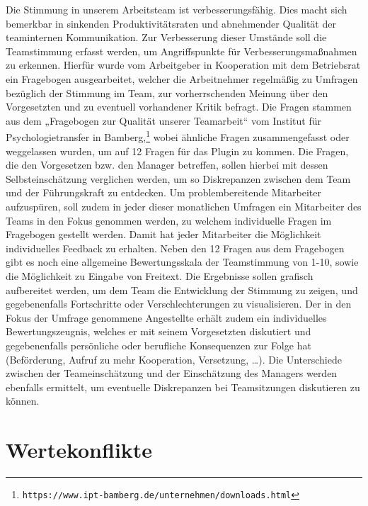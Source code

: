 \documentclass[a4paper,12pt,]{article}
\begin{document}
Die Stimmung in unserem Arbeitsteam ist verbesserungsfähig. Dies macht sich bemerkbar in sinkenden Produktivitätsraten und abnehmender Qualität der teaminternen Kommunikation. Zur Verbesserung dieser Umstände soll die Teamstimmung erfasst werden, um Angriffspunkte für Verbesserungsmaßnahmen zu erkennen.
Hierfür wurde vom Arbeitgeber in Kooperation mit dem Betriebsrat ein Fragebogen ausgearbeitet, welcher die Arbeitnehmer regelmäßig zu Umfragen bezüglich der Stimmung im Team, zur vorherrschenden Meinung über den Vorgesetzten und zu eventuell vorhandener Kritik befragt. Die Fragen stammen aus dem „Fragebogen zur Qualität unserer Teamarbeit“ vom Institut für Psychologietransfer in Bamberg,\footnote{\tt https://www.ipt-bamberg.de/unternehmen/downloads.html} wobei ähnliche Fragen zusammengefasst oder weggelassen wurden, um auf 12 Fragen für das Plugin zu kommen. Die Fragen, die den Vorgesetzen bzw. den Manager betreffen, sollen hierbei mit dessen Selbsteinschätzung verglichen werden, um so Diskrepanzen zwischen dem Team und der Führungskraft zu entdecken. Um problembereitende Mitarbeiter aufzuspüren, soll zudem in jeder dieser monatlichen Umfragen ein Mitarbeiter des Teams in den Fokus genommen werden, zu welchem individuelle Fragen im Fragebogen gestellt werden. Damit hat jeder Mitarbeiter die Möglichkeit  individuelles Feedback zu erhalten.
Neben den 12 Fragen aus dem Fragebogen gibt es noch eine allgemeine Bewertungsskala der Teamstimmung von 1-10, sowie die Möglichkeit zu Eingabe von Freitext.
Die Ergebnisse sollen grafisch aufbereitet werden, um dem Team die Entwicklung der Stimmung zu zeigen, und gegebenenfalls Fortschritte oder Verschlechterungen zu visualisieren. Der in den Fokus der Umfrage genommene Angestellte erhält zudem ein individuelles Bewertungszeugnis, welches er mit seinem Vorgesetzten diskutiert und gegebenenfalls persönliche oder berufliche Konsequenzen zur Folge hat (Beförderung, Aufruf zu mehr Kooperation, Versetzung, …).
Die Unterschiede zwischen der Teameinschätzung und der Einschätzung des Managers werden ebenfalls ermittelt, um eventuelle Diskrepanzen bei Teamsitzungen diskutieren zu können.

\section{Wertekonflikte}
\end{document}
